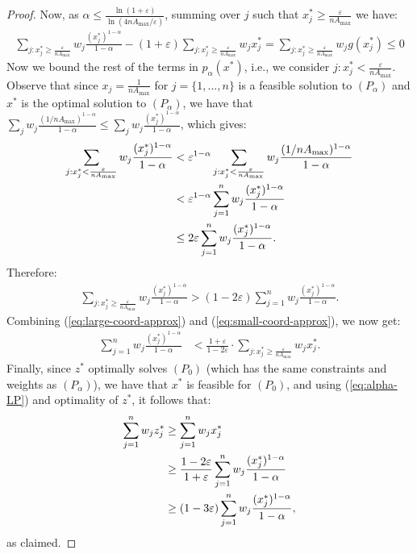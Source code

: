 \documentclass[11pt]{article}
\begin{document}
\begin{proof}
Now, as $\alpha \leq \frac{\ln(1+\varepsilon)}{\ln(4nA_{\max}/\varepsilon)}$, summing over $j$ such that $x_j^*\geq \frac{\varepsilon}{nA_{\max}}$ we have:
\begin{align}
\sum_{j: x_j^*\geq \frac{\varepsilon}{nA_{\max}}}w_j \frac{(x_j^*)^{1-\alpha}}{1-\alpha} - (1+\varepsilon)\sum_{j: x_j^*\geq \frac{\varepsilon}{nA_{\max}}}w_j x_j^* = \sum_{j: x_j^*\geq \frac{\varepsilon}{nA_{\max}}}w_j g(x_j^*)
\leq 0 \label{eq:large-coord-approx}
\end{align}
Now we bound the rest of the terms in $p_\alpha(x^*)$, i.e., we consider $j: x_j^* < \frac{\varepsilon}{nA_{\max}}$. Observe that since $x_j = \frac{1}{nA_{\max}}$ for $j=\{1,...,n\}$ is a feasible solution to $(P_{\alpha})$ and $x^*$ is the optimal solution to $(P_{\alpha})$, we have that $\sum_j w_j \frac{(1/nA_{\max})^{1-\alpha}}{1-\alpha}\leq \sum_j w_j \frac{(x_j^*)^{1-\alpha}}{1-\alpha}$, which gives:
\begin{align}
\sum_{j: x_j^*< \frac{\varepsilon}{nA_{\max}}}w_j \frac{(x_j^*)^{1-\alpha}}{1-\alpha} &< \varepsilon^{1-\alpha}\sum_{j: x_j^*< \frac{\varepsilon}{nA_{\max}}}w_j\frac{(1/nA_{\max})^{1-\alpha}}{1-\alpha }\notag\\
& < \varepsilon^{1-\alpha} \sum_{j=1}^n w_j \frac{(x_j^*)^{1-\alpha}}{1-\alpha}\notag\\
&\leq 2\varepsilon \sum_{j=1}^n w_j \frac{(x_j^*)^{1-\alpha}}{1-\alpha} \notag.
\end{align}
Therefore:
\begin{align}
\sum_{j: x_j^*\geq \frac{\varepsilon}{nA_{\max}}}w_j \frac{(x_j^*)^{1-\alpha}}{1-\alpha} > (1-2\varepsilon) \sum_{j=1}^n w_j \frac{(x_j^*)^{1-\alpha}}{1-\alpha}.\label{eq:small-coord-approx}
\end{align}
Combining (\ref{eq:large-coord-approx}) and (\ref{eq:small-coord-approx}), we now get:
\begin{align}
\sum_{j=1}^n w_j \frac{(x_j^*)^{1-\alpha}}{1-\alpha} &< \frac{1+\varepsilon}{1-2\varepsilon}\cdot \sum_{j: x_j^*\geq \frac{\varepsilon}{nA_{\max}}}w_j x_j^*. \label{eq:alpha-LP}
\end{align}
Finally, since $z^*$ optimally solves $(P_0)$ (which has the same constraints and weights as $(P_{\alpha})$), we have that $x^*$ is feasible for $(P_0)$, and using (\ref{eq:alpha-LP}) and optimality of $z^*$, it follows that:
\begin{align}
\sum_{j=1}^n w_j z_j^* &\geq \sum_{j=1}^n w_j x_j^* \notag\\
&\geq \frac{1-2\varepsilon}{1+\varepsilon} \sum_{j=1}^n w_j \frac{(x_j^*)^{1-\alpha}}{1-\alpha}\notag\\
&\geq (1-3\varepsilon) \sum_{j=1}^n w_j \frac{(x_j^*)^{1-\alpha}}{1-\alpha},\notag
\end{align}
as claimed.
\end{proof}
\end{document}
